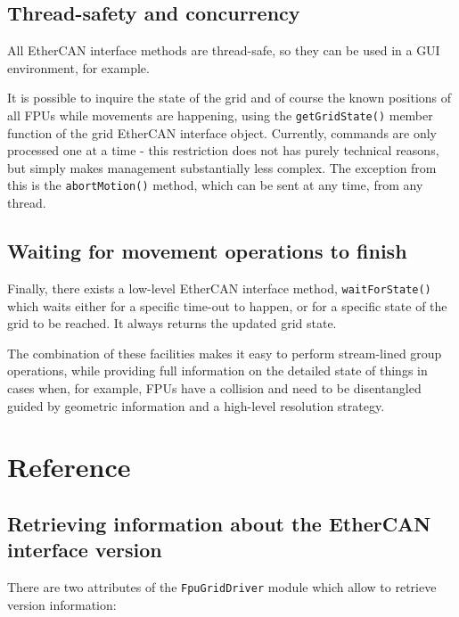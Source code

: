 \documentclass[11pt,a4paper]{scrartcl}
\begin{document}
\subsection{Thread-safety and concurrency}
All EtherCAN interface methods are thread-safe, so they can be used in a GUI
environment, for example.

It is possible to inquire the state of the grid and of course the
known positions of all FPUs while movements are happening, using the
\texttt{getGridState()} member function of the grid EtherCAN interface
object. Currently, commands are only processed one at a time - this
restriction does not has purely technical reasons, but simply makes
management substantially less complex. The exception from this is the
\texttt{abortMotion()} method, which can be sent at any time, from any
thread.

\subsection{Waiting for movement operations to finish}
Finally, there exists a low-level EtherCAN interface method,
\texttt{waitForState()} which waits either for a specific time-out to
happen, or for a specific state of the grid to be reached. It always
returns the updated grid state.

The combination of these facilities makes it easy to perform
stream-lined group operations, while providing full information on the
detailed state of things in cases when, for example, FPUs have a
collision and need to be disentangled guided by geometric information
and a high-level resolution strategy.



\section{Reference}
\label{sec:reference}

\subsection{Retrieving information about the EtherCAN interface version}
There are two attributes of the \texttt{FpuGridDriver} module
which allow to retrieve version information:
\end{document}
